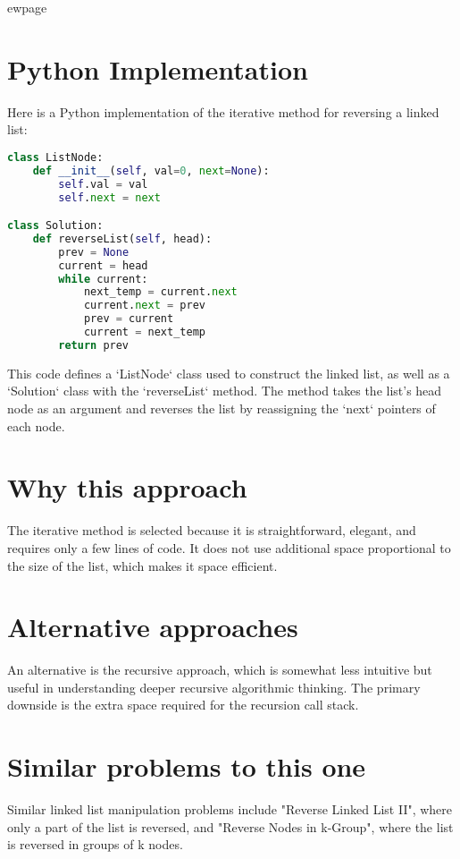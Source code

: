 ewpage %
\section*{Python Implementation}
Here is a Python implementation of the iterative method for reversing a linked list:

\begin{fullwidth}
\begin{lstlisting}[language=Python]
class ListNode:
    def __init__(self, val=0, next=None):
        self.val = val
        self.next = next

class Solution:
    def reverseList(self, head):
        prev = None
        current = head
        while current:
            next_temp = current.next
            current.next = prev
            prev = current
            current = next_temp
        return prev
\end{lstlisting}

\end{fullwidth}

This code defines a `ListNode` class used to construct the linked list, as well as a `Solution` class with the `reverseList` method. The method takes the list's head node as an argument and reverses the list by reassigning the `next` pointers of each node. 

\section*{Why this approach}
The iterative method is selected because it is straightforward, elegant, and requires only a few lines of code. It does not use additional space proportional to the size of the list, which makes it space efficient.

\section*{Alternative approaches}
An alternative is the recursive approach, which is somewhat less intuitive but useful in understanding deeper recursive algorithmic thinking. The primary downside is the extra space required for the recursion call stack.

\section*{Similar problems to this one}
Similar linked list manipulation problems include "Reverse Linked List II", where only a part of the list is reversed, and "Reverse Nodes in k-Group", where the list is reversed in groups of k nodes.

